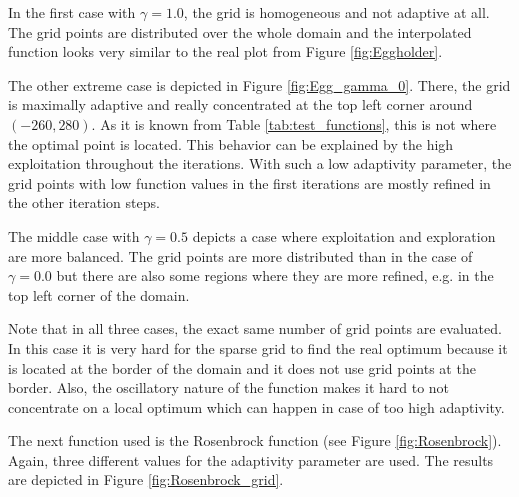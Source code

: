 In the first case with $ \gamma = 1.0 $, the grid is homogeneous and not adaptive at all. The grid points are distributed over the whole domain and the interpolated function looks very similar to the real plot from Figure \ref{fig:Eggholder}. 

The other extreme case is depicted in Figure \ref{fig:Egg_gamma_0}. There, the grid is maximally adaptive and really concentrated at the top left corner around $ (-260, 280) $. As it is known from Table \ref{tab:test_functions}, this is not where the optimal point is located. This behavior can be explained by the high exploitation throughout the iterations. With such a low adaptivity parameter, the grid points with low function values in the first iterations are mostly refined in the other iteration steps. 

The middle case with $ \gamma = 0.5 $ depicts a case where exploitation and exploration are more balanced. The grid points are more distributed than in the case of $ \gamma = 0.0 $ but there are also some regions where they are more refined, e.g. in the top left corner of the domain.

Note that in all three cases, the exact same number of grid points are evaluated. In this case it is very hard for the sparse grid to find the real optimum because it is located at the border of the domain and it does not use grid points at the border. Also, the oscillatory nature of the function makes it hard to not concentrate on a local optimum which can happen in case of too high adaptivity. \newline

The next function used is the Rosenbrock function (see Figure \ref{fig:Rosenbrock}). Again, three different values for the adaptivity parameter are used. The results are depicted in Figure \ref{fig:Rosenbrock_grid}.

